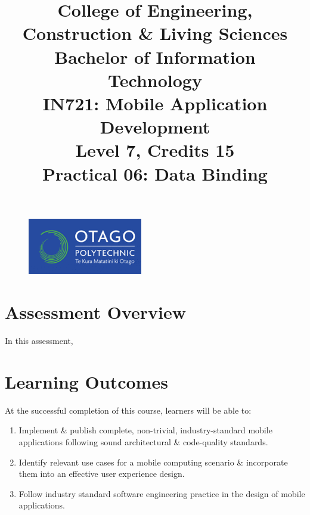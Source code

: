\documentclass{article}
\author{}
\begin{document}
\begin{figure}
    \centering
    \includegraphics[width=50mm]{../../resources/img/logo.png}
\end{figure}

\title{College of Engineering, Construction \& Living Sciences\\Bachelor of Information Technology\\IN721: Mobile Application Development\\Level 7, Credits 15\\\textbf{Practical 06: Data Binding}}
\date{}
\maketitle

\section*{Assessment Overview}
In this assessment, 

\section*{Learning Outcomes}
At the successful completion of this course, learners will be able to: 
\begin{enumerate}
	\item Implement \& publish complete, non-trivial, industry-standard mobile applications following sound architectural \& code-quality standards.
	\item Identify relevant use cases for a mobile computing scenario \& incorporate them into an effective user experience design.
	\item Follow industry standard software engineering practice in the design of mobile applications.
\end{enumerate} 
\end{document}
